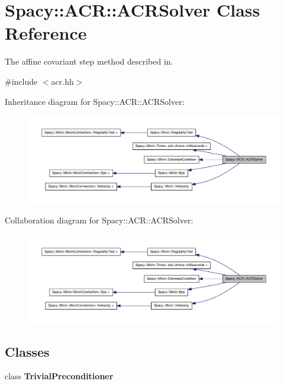 \hypertarget{classSpacy_1_1ACR_1_1ACRSolver}{\section{\-Spacy\-:\-:\-A\-C\-R\-:\-:\-A\-C\-R\-Solver \-Class \-Reference}
\label{classSpacy_1_1ACR_1_1ACRSolver}
}


\-The affine covariant step method described in.  




{\ttfamily \#include $<$acr.\-hh$>$}



\-Inheritance diagram for \-Spacy\-:\-:\-A\-C\-R\-:\-:\-A\-C\-R\-Solver\-:
\nopagebreak
\begin{figure}[H]
\begin{center}
\leavevmode
\includegraphics[width=350pt]{classSpacy_1_1ACR_1_1ACRSolver__inherit__graph}
\end{center}
\end{figure}


\-Collaboration diagram for \-Spacy\-:\-:\-A\-C\-R\-:\-:\-A\-C\-R\-Solver\-:
\nopagebreak
\begin{figure}[H]
\begin{center}
\leavevmode
\includegraphics[width=350pt]{classSpacy_1_1ACR_1_1ACRSolver__coll__graph}
\end{center}
\end{figure}
\subsection*{\-Classes}
\begin{DoxyCompactItemize}
\item 
class {\bfseries \-Trivial\-Preconditioner}
\end{DoxyCompactItemize}
